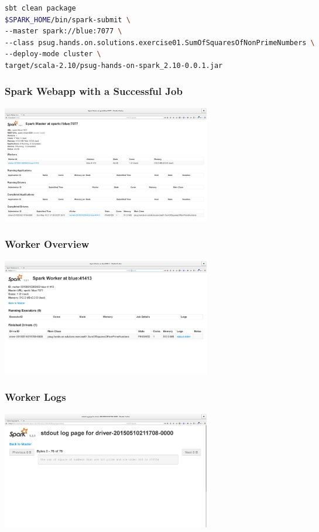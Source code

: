 \documentclass[slidetop,9pt,utf8]{beamer}
\begin{document}
\begin{CJK}{UTF8}{gbsn}
\begin{frame}[fragile]
  \begin{lstlisting}[language=bash, style=terminal-large]
sbt clean package
$SPARK_HOME/bin/spark-submit \ 
--master spark://blue:7077 \ 
--class psug.hands.on.solutions.exercise01.SumOfSquaresOfNonPrimeNumbers \ 
--deploy-mode cluster \ 
target/scala-2.10/psug-hands-on-spark_2.10-0.0.1.jar
  \end{lstlisting} 

\end{frame}

\begin{frame}

  \frametitle{Spark Webapp with a Successful Job}

  \includegraphics[width=345px]{images/spark_webapp_driver_success.png}

\end{frame}

\begin{frame}

  \frametitle{Worker Overview}

  \includegraphics[width=345px]{images/spark_webapp_worker_overview.png}

\end{frame}

\begin{frame}

  \frametitle{Worker Logs}

  \includegraphics[width=345px]{images/spark_webapp_worker_logs.png}


\end{frame}
\end{CJK}
\end{document}
